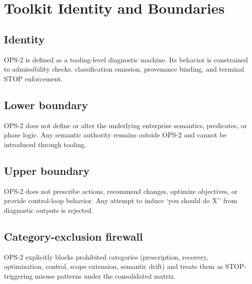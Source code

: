 ﻿%

\section{Toolkit Identity and Boundaries}

\subsection{Identity}
OPS-2 is defined as a tooling-level diagnostic machine. Its behavior is constrained
to admissibility checks, classification emission, provenance binding, and terminal
STOP enforcement.

\subsection{Lower boundary}
OPS-2 does not define or alter the underlying enterprise semantics, predicates, or
phase logic. Any semantic authority remains outside OPS-2 and cannot be introduced
through tooling.

\subsection{Upper boundary}
OPS-2 does not prescribe actions, recommend changes, optimize objectives, or provide
control-loop behavior. Any attempt to induce `you should do X'' from diagnostic
outputs is rejected.

\subsection{Category-exclusion firewall}
OPS-2 explicitly blocks prohibited categories (prescription, recovery, optimization,
control, scope extension, semantic drift) and treats them as STOP-triggering misuse
patterns under the consolidated matrix.
